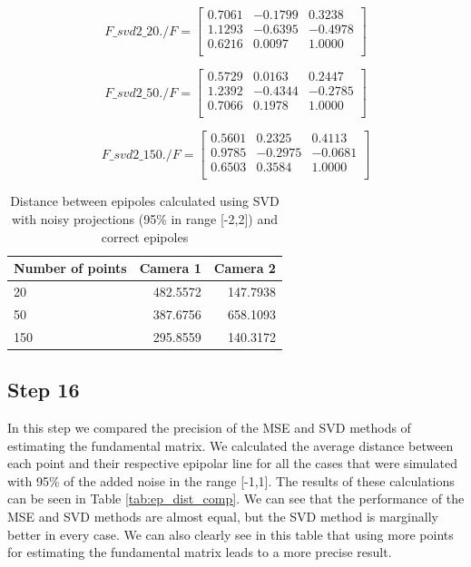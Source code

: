 \documentclass[peerreview,11pt]{IEEEtran}
\begin{document}
\[
F\_svd2\_20./F = 
\begin{bmatrix}
    0.7061  & -0.1799  &  0.3238\\
    1.1293  & -0.6395  & -0.4978\\
    0.6216  &  0.0097  &  1.0000\\
\end{bmatrix}
\]


\[
F\_svd2\_50./F = 
\begin{bmatrix}
    0.5729  &  0.0163  &  0.2447\\
    1.2392  & -0.4344  & -0.2785\\
    0.7066  &  0.1978  &  1.0000\\
\end{bmatrix}
\]


\[
F\_svd2\_150./F = 
\begin{bmatrix}
    0.5601  &  0.2325  &  0.4113\\
    0.9785  & -0.2975  & -0.0681\\
    0.6503  &  0.3584  &  1.0000\\
\end{bmatrix}
\]

\begin{table}[H]
	\caption{Distance between epipoles calculated using SVD with noisy projections (95\% in range [-2,2]) and correct epipoles}
	\centering
	\begin{tabular}{l | r r }\label{tab:ep_dist_svd_n2}
		Number of points & Camera 1 & Camera 2 \\
		\hline
		20 & 482.5572 & 147.7938 \\
		50 & 387.6756 & 658.1093 \\
		150 & 295.8559 & 140.3172 \\
	\end{tabular}
\end{table}


\subsection{Step 16}

In this step we compared the precision of the MSE and SVD methods of estimating the fundamental matrix. We calculated the average distance between each point and their respective epipolar line for all the cases that were simulated with 95\% of the added noise in the range [-1,1]. The results of these calculations can be seen in Table \ref{tab:ep_dist_comp}. We can see that the performance of the MSE and SVD methods are almost equal, but the SVD method is marginally better in every case. We can also clearly see in this table that using more points for estimating the fundamental matrix leads to a more precise result.
\end{document}
